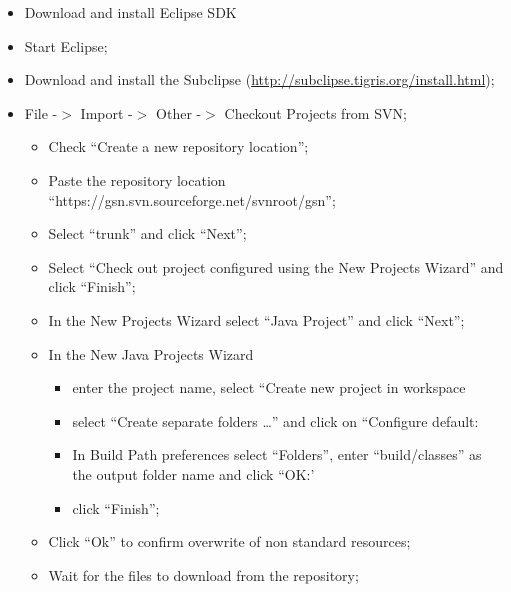 \begin{itemize}
	\item Download and install Eclipse SDK
	\item Start Eclipse;
	\item Download and install the Subclipse
(\url{http://subclipse.tigris.org/install.html});
	\item File -\begin{math}>\end{math} Import -\begin{math}>\end{math} Other
-\begin{math}>\end{math} Checkout Projects from SVN;
\begin{itemize}
	\item Check \textquotedblleft{}Create a new repository
location\textquotedblright{};
	\item Paste the repository location
\textquotedblleft{}https://gsn.svn.sourceforge.net/svnroot/gsn\textquotedblright{};
	\item Select \textquotedblleft{}trunk\textquotedblright{} and click
\textquotedblleft{}Next\textquotedblright{};
	\item Select \textquotedblleft{}Check out project configured using the New
Projects Wizard\textquotedblright{} and click
\textquotedblleft{}Finish\textquotedblright{};
	\item In the New Projects Wizard select \textquotedblleft{}Java
Project\textquotedblright{} and click
\textquotedblleft{}Next\textquotedblright{};
	\item In the New Java Projects Wizard
\begin{itemize}
	\item enter the project name, select \textquotedblleft{}Create new project
in workspace
	\item select \textquotedblleft{}Create separate folders
\ldots{}\textquotedblright{} and click on \textquotedblleft{}Configure
default:
	\item In Build Path preferences select
\textquotedblleft{}Folders\textquotedblright{}, enter
\textquotedblleft{}build/classes\textquotedblright{} as the output
folder name and click \textquotedblleft{}OK:'
	\item click \textquotedblleft{}Finish\textquotedblright{};
\end{itemize}

	\item Click \textquotedblleft{}Ok\textquotedblright{} to confirm overwrite
of non standard resources;
	\item Wait for the files to download from the repository;
\end{itemize}


\end{itemize}
